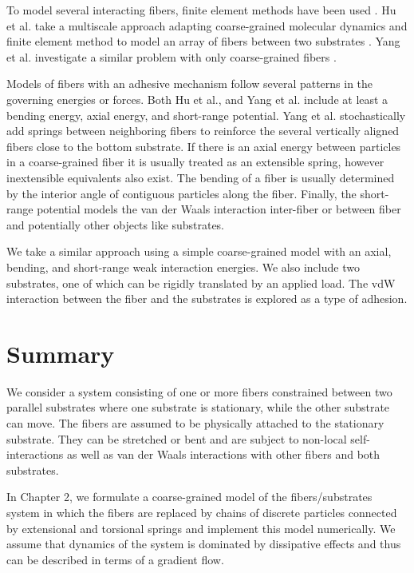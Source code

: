 	To model several interacting fibers, finite element methods have been used \cite{Radhakrishnan2013}. Hu et al. take a multiscale approach adapting coarse-grained molecular dynamics and finite element method to model an array of fibers between two substrates \cite{Hu2010}. Yang et al. investigate a similar problem with only coarse-grained fibers \cite{Yang2012}.
	
	Models of fibers with an adhesive mechanism follow several patterns in the governing energies or forces. Both Hu et al., and Yang et al. include at least a bending energy, axial energy, and short-range potential. Yang et al. stochastically add springs between neighboring fibers to reinforce the several vertically aligned fibers close to the bottom substrate. If there is an axial energy between particles in a coarse-grained fiber it is usually treated as an extensible spring, however inextensible equivalents also exist. The bending of a fiber is usually determined by the interior angle of contiguous particles along the fiber. Finally, the short-range potential models the van der Waals interaction inter-fiber or between fiber and potentially other objects like substrates. 

	We take a similar approach using a simple coarse-grained model with an axial, bending, and short-range weak interaction energies. We also include two substrates, one of which can be rigidly translated by an applied load. The vdW interaction between the fiber and the substrates is explored as a type of adhesion.
	
\section{Summary}

We consider a system consisting of one or more fibers constrained between two parallel substrates where one substrate is stationary, while the other substrate can move. 
The fibers are assumed to be physically attached to the stationary substrate. 
They can be stretched or bent and are subject to non-local self-interactions as well as van der Waals interactions with other fibers and both substrates. 

In Chapter 2, we formulate a coarse-grained model of the fibers/substrates system in which the fibers are replaced by chains of discrete particles connected by extensional and torsional springs and implement this model numerically. 
We assume that dynamics of the system is dominated by dissipative effects and thus can be described in terms of a gradient flow. 

